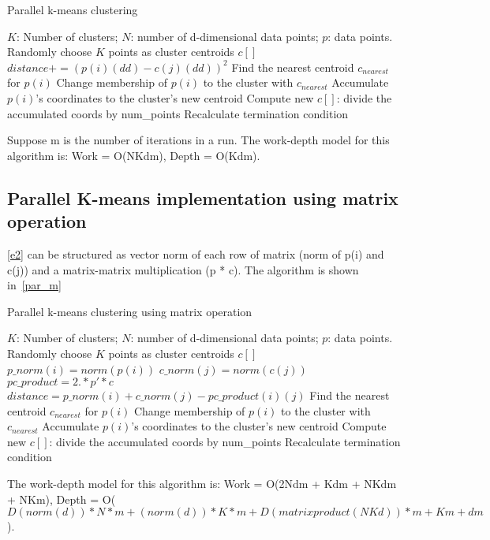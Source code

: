 \begin{algorithm}[!h]
  \caption{Parallel k-means clustering} \label{par}
  \begin{algorithmic}[1]
    \INPUT $K$: Number of clusters; $N$: number of d-dimensional data points; $p$: data points.
     \label{alg:p}
    \State Randomly choose $K$ points as cluster centroids $c[]$
    \State $distance += (p(i)(dd) - c(j)(dd))^2$
    \EndFor
    \EndFor
    \State Find the nearest centroid $c_{nearest}$ for $p(i)$
    \State Change membership of $p(i)$ to the cluster with $c_{nearest}$
    \State Accumulate $p(i)$'s coordinates to the cluster's new centroid
    \EndParFor
    \State Compute new $c[]$: divide the accumulated coords by num\_points
    \State Recalculate termination condition
    \EndWhile
    \EndFunction  
  \end{algorithmic}
\end{algorithm}

Suppose m is the number of iterations in a run. The work-depth model for this algorithm is:
Work = O(NKdm), Depth = O(Kdm).



\subsection{Parallel K-means implementation using matrix operation}
\label{ss:cublas}

\ref{e2} can be structured as vector norm of each row of matrix (norm of p(i) and c(j)) and
a matrix-matrix multiplication (p * c). The algorithm is shown in~\ref{par_m}
\begin{algorithm}[!h]
  \caption{Parallel k-means clustering using matrix operation} \label{par_m}
  \begin{algorithmic}[1]
    \INPUT $K$: Number of clusters; $N$: number of d-dimensional data points; $p$: data points.
     \label{alg:pm}
    \State Randomly choose $K$ points as cluster centroids $c[]$
    \State $p\_norm(i) = norm(p(i))$
    \EndFor
    \State $c\_norm(j) = norm(c(j))$
    \EndFor
    \State $pc\_product = 2 .* p' * c$
    \State $distance = p\_norm(i) + c\_norm(j) - pc\_product(i)(j)$
    \EndFor
    \State Find the nearest centroid $c_{nearest}$ for $p(i)$
    \State Change membership of $p(i)$ to the cluster with $c_{nearest}$
    \State Accumulate $p(i)$'s coordinates to the cluster's new centroid
    \EndParFor
    \State Compute new $c[]$: divide the accumulated coords by num\_points
    \State Recalculate termination condition
    \EndWhile
    \EndFunction
  \end{algorithmic}
\end{algorithm}
The work-depth model for this algorithm is: Work = O(2Ndm + Kdm + NKdm + NKm), Depth = O($D(norm(d))*N*m + (norm(d))*K*m + D(matrix product(NKd))*m + Km + dm$).

